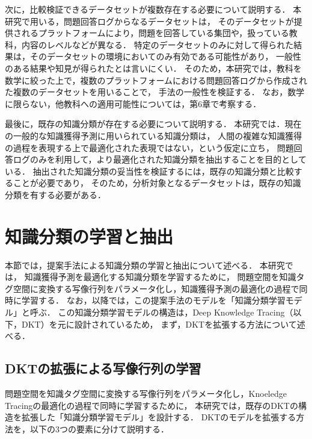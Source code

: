 次に，比較検証できるデータセットが複数存在する必要について説明する．
本研究で用いる，問題回答ログからなるデータセットは，
そのデータセットが提供されるプラットフォームにより，問題を回答している集団や，扱っている教科，内容のレベルなどが異なる．
特定のデータセットのみに対して得られた結果は，そのデータセットの環境においてのみ有効である可能性があり，
一般性のある結果や知見が得られたとは言いにくい．
そのため，本研究では，教科を数学に絞った上で，複数のプラットフォームにおける問題回答ログから作成された複数のデータセットを用いることで，
手法の一般性を検証する．
なお，数学に限らない，他教科への適用可能性については，第6章で考察する．


最後に，既存の知識分類が存在する必要について説明する．
本研究では．現在の一般的な知識獲得予測に用いられている知識分類は，
人間の複雑な知識獲得の過程を表現する上で最適化された表現ではない，という仮定に立ち，
問題回答ログのみを利用して，より最適化された知識分類を抽出することを目的としている．
抽出された知識分類の妥当性を検証するには，既存の知識分類と比較することが必要であり，
そのため，分析対象となるデータセットは，既存の知識分類を有する必要がある．





\section{知識分類の学習と抽出}
本節では，提案手法による知識分類の学習と抽出について述べる．
本研究では，
知識獲得予測を最適化する知識分類を学習するために，
問題空間を知識タグ空間に変換する写像行列をパラメータ化し，知識獲得予測の最適化の過程で同時に学習する．
なお，以降では，この提案手法のモデルを「知識分類学習モデル」と呼ぶ．
この知識分類学習モデルの構造は，Deep Knowledge Tracing（以下，DKT）を元に設計されているため，
まず，DKTを拡張する方法について述べる．



\subsection{DKTの拡張による写像行列の学習}
\label{sec:tag_learn}

問題空間を知識タグ空間に変換する写像行列をパラメータ化し，Knoeledge Tracingの最適化の過程で同時に学習するために，
本研究では，既存のDKTの構造を拡張した「知識分類学習モデル」を設計する．
DKTのモデルを拡張する方法を，以下の3つの要素に分けて説明する．

